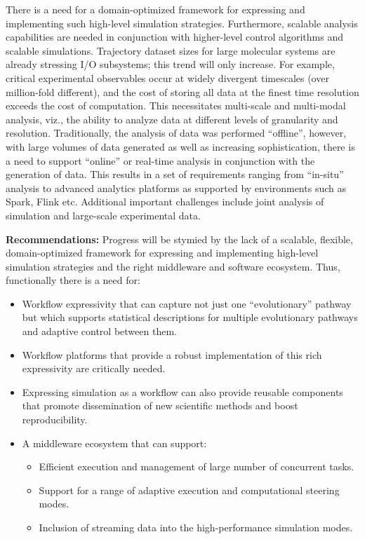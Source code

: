 \documentclass[10pt,letterpaper,draft]{article}
\begin{document}
There is a need for a domain-optimized framework for expressing and implementing
such high-level simulation strategies. Furthermore, scalable analysis
capabilities are needed in conjunction with higher-level control algorithms and
scalable simulations. Trajectory dataset sizes for large molecular systems are
already stressing I/O subsystems; this trend will only increase. For example,
critical experimental observables occur at widely divergent timescales (over
million-fold different), and the cost of storing all data at the finest time
resolution exceeds the cost of computation.  This necessitates multi-scale and
multi-modal analysis, viz., the ability to analyze data at different levels of
granularity and resolution. Traditionally, the analysis of data was performed
``offline'', however, with large volumes of data generated as well as increasing
sophistication, there is a need to support ``online'' or real-time analysis in
conjunction with the generation of data. This results in a set of requirements
ranging from ``in-situ'' analysis to advanced analytics platforms as supported
by environments such as Spark, Flink etc.  Additional important challenges
include joint analysis of simulation and large-scale experimental data.


\newpage

{\noindent \bf Recommendations:} Progress will be stymied by the lack of a scalable,
flexible, domain-optimized framework for expressing and implementing high-level
simulation strategies and the right middleware and software ecosystem. Thus,
functionally there is a need for:
\begin{itemize}
\item Workflow expressivity that can capture not just one ``evolutionary'' pathway but which supports statistical descriptions for multiple evolutionary pathways and adaptive control between them. 
\item Workflow platforms that provide a robust implementation of this rich expressivity are critically needed.
\item Expressing simulation as a workflow can also provide reusable components that promote dissemination of new scientific methods and boost reproducibility.
\item A middleware ecosystem that can support:
\begin{itemize} 
\item Efficient execution and management of large number of concurrent tasks.
\item Support for a range of adaptive execution and computational steering
  modes.
\item Inclusion of streaming data into  the high-performance simulation modes.
\end{itemize}
\end{itemize}
\end{document}
